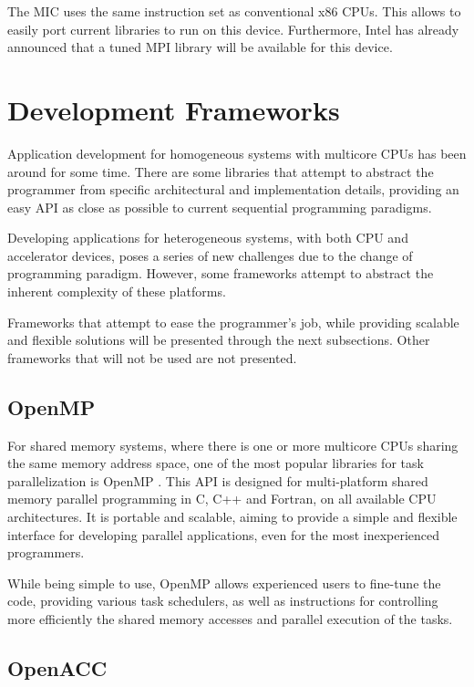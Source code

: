 The MIC uses the same instruction set as conventional x86 CPUs. This allows to easily port current libraries to run on this device. Furthermore, Intel has already announced that a tuned MPI library will be available for this device.

\section{Development Frameworks}

Application development for homogeneous systems with multicore CPUs has been around for some time. There are some libraries that attempt to abstract the programmer from specific architectural and implementation details, providing an easy API as close as possible to current sequential programming paradigms.

Developing applications for heterogeneous systems, with both CPU and accelerator devices, poses a series of new challenges due to the change of programming paradigm. However, some frameworks attempt to abstract the inherent complexity of these platforms.

Frameworks that attempt to ease the programmer’s job, while providing scalable and flexible solutions will be presented through the next subsections. Other frameworks that will not be used are not presented.

\subsection{OpenMP}

For shared memory systems, where there is one or more multicore CPUs sharing the same memory address space, one of the most popular libraries for task parallelization is OpenMP \cite{OpenMP}. This API is designed for multi-platform shared memory parallel programming in C, C++ and Fortran, on all available CPU architectures. It is portable and scalable, aiming to provide a simple and flexible interface for developing parallel applications, even for the most inexperienced programmers.

While being simple to use, OpenMP allows experienced users to fine-tune the code, providing various task schedulers, as well as instructions for controlling more efficiently the shared memory accesses and parallel execution of the tasks.

\subsection{OpenACC}


